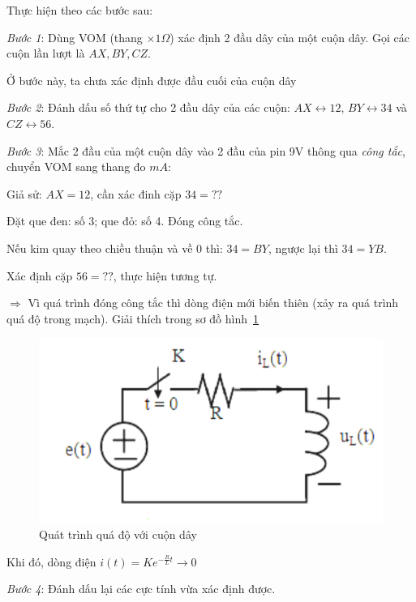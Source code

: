 \documentclass[13pt,a4paper]{extarticle}
\begin{document}
Thực hiện theo các bước sau:
\begin{list}{--}{}
\item \textit{Bước 1}: Dùng VOM (thang $\times 1 \Omega$) xác định 2 đầu dây của một cuộn dây. Gọi các cuộn lần lượt là $AX, BY, CZ$.

Ở bước này, ta chưa xác định được đầu cuối của cuộn dây
\item \textit{Bước 2}: Đánh dấu số thứ tự cho 2 đầu dây của các cuộn: $AX \longleftrightarrow 12$, $BY \longleftrightarrow 34$ và $CZ \longleftrightarrow 56$.
\item \textit{Bước 3}: Mắc 2 đầu của một cuộn dây vào 2 đầu của pin 9V thông qua \textit{công tắc}, chuyển VOM sang thang đo $mA$:
\begin{list}{+}{}
\item Giả sử: $AX = 12$, cần xác đinh cặp $34 = ??$
\item Đặt que đen: số 3; que đỏ: số 4. Đóng công tắc.
\item Nếu kim quay theo chiều thuận và về 0 thì: $34=BY$, ngược lại thì $34 = YB$.
\item Xác định cặp $56 = ??$, thực hiện tương tự.
\item[$\Longrightarrow$] Vì quá trình đóng công tắc thì dòng điện mới biến thiên (xảy ra quá trình quá độ trong mạch). Giải thích trong sơ đồ hình~\ref{Fig:qua-do}
\begin{figure}[!h]
\begin{center}
\includegraphics[scale=.5]{quado-1}
\end{center}
\caption{Quát trình quá độ với cuộn dây}\label{Fig:qua-do}
\end{figure}

Khi đó, dòng điện $\displaystyle i\left({t}\right) = Ke^{-\frac{R}{L}t} \longrightarrow 0$
\end{list}
\item \textit{Bước 4}: Đánh dấu lại các cực tính vừa xác định được.
\end{list}
\newpage
\end{document}
